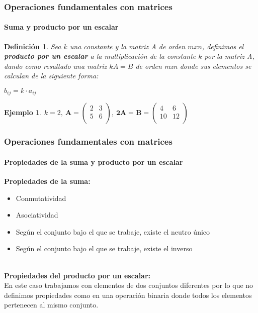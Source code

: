 \documentclass[11pt]{beamer}
\newtheorem{defi}{Definición}
\newtheorem{ejem}{Ejemplo}
\begin{document}
\begin{frame}
\frametitle{Operaciones fundamentales con matrices}
\framesubtitle{Suma y producto por un escalar}
\begin{defi}
Sea $k$ una constante y la matriz A de orden $mxn$, definimos el \textbf{producto por un escalar} a la multiplicación de la constante $k$ por la matriz A, dando como resultado una matriz $kA = B$ de orden mxn donde sus elementos se calculan de la siguiente forma:\\
\begin{center}
$b_{ij} = k\cdot a_{ij}$
\end{center}
\end{defi}
\begin{ejem}
$k = 2, ~ {\displaystyle \mathbf {A} ={\begin{pmatrix}2&3\\5&6\\\end{pmatrix}}}$,
${\displaystyle \mathbf {2A = B} ={\begin{pmatrix}4&6\\10&12\\\end{pmatrix}}}$ 
\end{ejem}
\end{frame}

\begin{frame}
\frametitle{Operaciones fundamentales con matrices}
\framesubtitle{Propiedades de la suma y producto por un escalar}
\textbf{Propiedades de la suma:}
\begin{itemize}
\item Conmutatividad
\item Asociatividad
\item Según el conjunto bajo el que se trabaje, existe el neutro único
\item Según el conjunto bajo el que se trabaje, existe el inverso\\ \hspace{0cm} \\
\end{itemize}
\textbf{Propiedades del producto por un escalar:}\\
En este caso trabajamos con elementos de dos conjuntos diferentes por lo que no definimos propiedades como en una operación binaria donde todos los elementos pertenecen al mismo conjunto.
\end{frame}
\end{document}
